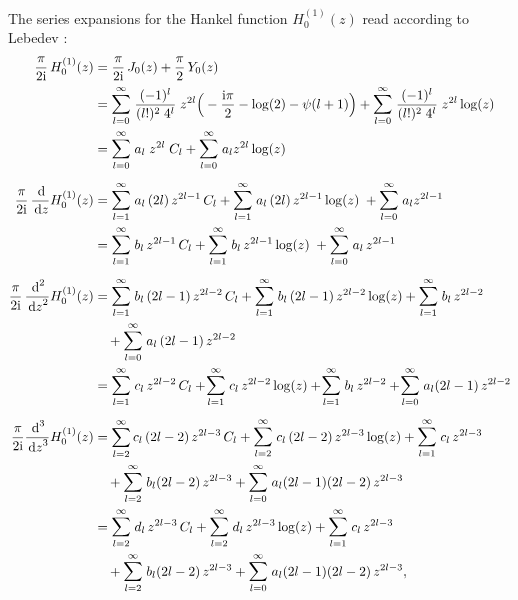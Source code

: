 \newpage
The series expansions for the Hankel function $H_0^{(1)}(z)$ read according to Lebedev  \cite[Sec. 5.6]{lebedev}:
\begin{align*}
  \frac{\pi}{2 \ii} \, H_0^{(1)}(z)
  &= \frac{\pi}{2\ii} \, J_0(z) + \frac{\pi}{2}\, Y_0(z) \\
  &= \mathlarger{\sum}_{l = 0}^\infty \; \frac{(-1)^l}{(l!)^2 \; 4^l} \;  z^{2l} \Big( -\frac{\ii \pi}{2} - \log(2) - \psi(l + 1) \Big) 
  +  \mathlarger{\sum}_{l = 0}^\infty \; \frac{(-1)^l}{(l!)^2 \; 4^l} \;  z^{2l} \log(z) \\
  &= \mathlarger{\sum}_{l = 0}^\infty \; a_l \;  z^{2l} \; C_l 
  + \mathlarger{\sum}_{l = 0}^\infty \; a_l z^{2l} \log(z) \\[0.5em]
  \frac{\pi}{2\ii} \, \frac{\d{}}{\d z} H_0^{(1)}(z)
  &= \mathlarger{\sum}_{l = 1}^\infty \; a_l \,  (2l) \, z^{2l - 1} \, C_l 
  + \mathlarger{\sum}_{l = 1}^\infty \; a_l \, (2l)  \, z^{2l - 1} \log(z) \; 
  + \mathlarger{\sum}_{l = 0}^\infty \; a_l z^{2l - 1} \\
  &= \mathlarger{\sum}_{l = 1}^\infty \; b_l \, z^{2l - 1} \, C_l 
  + \mathlarger{\sum}_{l = 1}^\infty \; b_l \, z^{2l - 1} \log(z) \; 
  +  \mathlarger{\sum}_{l = 0}^\infty \; a_l \, z^{2l - 1} \\[0.5em]
  \frac{\pi}{2\ii} \, \frac{\d{}^2}{\d z^2} H_0^{(1)}(z)
  &= \mathlarger{\sum}_{l = 1}^\infty \; b_l \, (2l - 1) \, z^{2l - 2} \, C_l 
  + \mathlarger{\sum}_{l = 1}^\infty \; b_l \, (2l - 1)\, z^{2l - 2} \log(z) 
  + \mathlarger{\sum}_{l = 1}^\infty \; b_l \, z^{2l - 2}\\
  &\quad + \mathlarger{\sum}_{l = 0}^\infty \; a_l \, (2l - 1) \, z^{2l - 2} \\
  &= \mathlarger{\sum}_{l = 1}^\infty \; c_l \, z^{2l - 2} \, C_l 
  +  \!\mathlarger{\sum}_{l = 1}^\infty \; c_l \, z^{2l - 2} \log(z) 
  +  \!\mathlarger{\sum}_{l = 1}^\infty \; b_l \, z^{2l - 2} 
  +  \!\mathlarger{\sum}_{l = 0}^\infty \; a_l (2l - 1) \, z^{2l - 2} \\[0.5em]
  \frac{\pi}{2\ii} \frac{\d{}^3}{\d z^3} H_0^{(1)}(z)
  &= \sum_{l = 2}^\infty c_l \, (2l - 2) \, z^{2l - 3} \, C_l 
  +  \mathlarger{\sum}_{l = 2}^\infty \; c_l \, (2l - 2) \, z^{2l - 3} \log(z) 
  +  \mathlarger{\sum}_{l = 1}^\infty \; c_l \, z^{2l - 3} \\
 &\quad  
  + \mathlarger{\sum}_{l = 2}^\infty \; b_l (2l - 2) \, z^{2l - 3} 
  + \mathlarger{\sum}_{l = 0}^\infty \; a_l (2l - 1) (2l - 2) \, z^{2l - 3} \\
  &= \mathlarger{\sum}_{l = 2}^\infty \; d_l \, z^{2l - 3} \, C_l 
  + \mathlarger{\sum}_{l = 2}^\infty \; d_l \, z^{2l - 3} \log(z) 
  + \mathlarger{\sum}_{l = 1}^\infty \; c_l \, z^{2l - 3} \\
 &\quad  + \mathlarger{\sum}_{l = 2}^\infty \; b_l (2l - 2) \, z^{2l - 3} 
  + \mathlarger{\sum}_{l = 0}^\infty \; a_l (2l - 1) (2l - 2) \, z^{2l - 3} ,
\end{align*}
